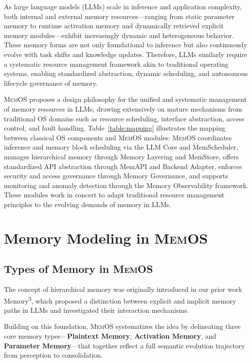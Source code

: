\documentclass[]{memtensor}
\begin{document}
As large language models (LLMs) scale in inference and application complexity, both internal and external memory resources—ranging from static parameter memory to runtime activation memory and dynamically retrieved explicit memory modules—exhibit increasingly dynamic and heterogeneous behavior. These memory forms are not only foundational to inference but also continuously evolve with task shifts and knowledge updates. Therefore, LLMs similarly require a systematic resource management framework akin to traditional operating systems, enabling standardized abstraction, dynamic scheduling, and autonomous lifecycle governance of memory.

\textsc{MemOS} proposes a design philosophy for the unified and systematic management of memory resources in LLMs, drawing extensively on mature mechanisms from traditional OS domains such as resource scheduling, interface abstraction, access control, and fault handling. Table~\ref{table:mapping} illustrates the mapping between classical OS components and \textsc{MemOS} modules: \textsc{MemOS} coordinates inference and memory block scheduling via the LLM Core and MemScheduler, manages hierarchical memory through Memory Layering and MemStore, offers standardized API abstraction through MemAPI and Backend Adapter, enforces security and access governance through Memory Governance, and supports monitoring and anomaly detection through the Memory Observability framework. These modules work in concert to adapt traditional resource management principles to the evolving demands of memory in LLMs.



\section{Memory Modeling in \textsc{MemOS}}

\subsection{Types of Memory in \textsc{MemOS}}

The concept of hierarchical memory was originally introduced in our prior work Memory\textsuperscript{3}\cite{memory3_Yang_2024}, which proposed a distinction between explicit and implicit memory paths in LLMs and investigated their interaction mechanisms.

Building on this foundation, \textsc{MemOS} systematizes the idea by delineating three core memory types—\textbf{Plaintext Memory}, \textbf{Activation Memory}, and \textbf{Parameter Memory}—that together reflect a full semantic evolution trajectory from perception to consolidation.
\end{document}
